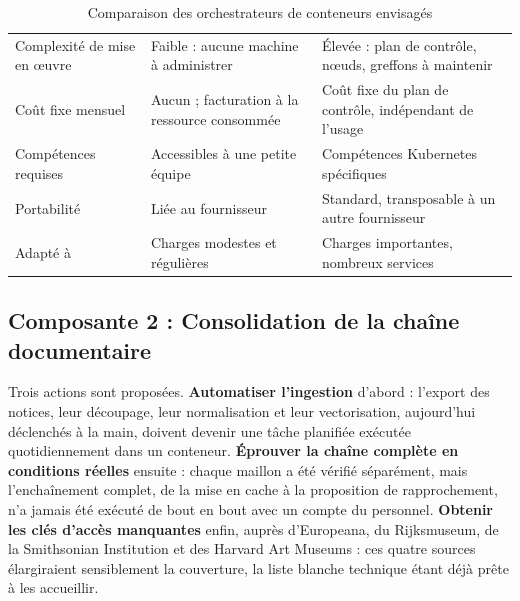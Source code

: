 \begin{table}[!ht]
\centering
\caption{Comparaison des orchestrateurs de conteneurs envisagés}
\label{tab:orchestrateur}
\small
\begin{tabularx}{\textwidth}{|L{3.0cm}|X|X|}
\hline
{}
 &  &  \\ \hline
Complexité de mise en œuvre & Faible : aucune machine à administrer & Élevée : plan de contrôle, nœuds, greffons à maintenir \\ \hline
Coût fixe mensuel & Aucun ; facturation à la ressource consommée & Coût fixe du plan de contrôle, indépendant de l'usage \\ \hline
Compétences requises & Accessibles à une petite équipe & Compétences Kubernetes spécifiques \\ \hline
Portabilité & Liée au fournisseur & Standard, transposable à un autre fournisseur \\ \hline
Adapté à & Charges modestes et régulières & Charges importantes, nombreux services \\ \hline
\end{tabularx}
\end{table}


\subsection{Composante 2 : Consolidation de la chaîne documentaire}

Trois actions sont proposées. \textbf{Automatiser l'ingestion} d'abord : l'export
des notices, leur découpage, leur normalisation et leur vectorisation, aujourd'hui
déclenchés à la main, doivent devenir une tâche planifiée exécutée quotidiennement
dans un conteneur. \textbf{Éprouver la chaîne complète en conditions réelles}
ensuite : chaque maillon a été vérifié séparément, mais l'enchaînement complet,
de la mise en cache à la proposition de rapprochement, n'a jamais été exécuté de
bout en bout avec un compte du personnel. \textbf{Obtenir les clés d'accès
manquantes} enfin, auprès d'Europeana, du Rijksmuseum, de la Smithsonian
Institution et des Harvard Art Museums : ces quatre sources élargiraient
sensiblement la couverture, la liste blanche technique étant déjà prête à les
accueillir.

